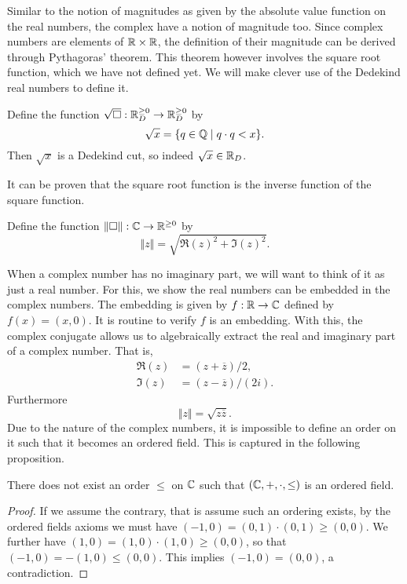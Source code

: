 \documentclass[../main.tex]{subfiles}
\begin{document}
Similar to the notion of magnitudes as given by the absolute value function on the real numbers, the complex have a notion of magnitude too. Since complex numbers are elements of $\mathbb{R}\times\mathbb{R}$, the definition of their magnitude can be derived through Pythagoras' theorem. This theorem however involves the square root function, which we have not defined yet. We will make clever use of the Dedekind real numbers to define it.
\begin{definition}
    Define the function $\sqrt{\Box}:\mathbb{R}_D^{\geq0}\to\mathbb{R}_D^{\geq0}$ by
    \begin{equation*}
        \sqrt{x}=\{q\in\mathbb{Q}\mid q\cdot q<x\}.
    \end{equation*}
    Then $\sqrt{x}$ is a Dedekind cut, so indeed $\sqrt{x}\in\mathbb{R}_D$.
\end{definition}
It can be proven that the square root function is the inverse function of the square function.
\begin{definition}
    Define the function $\Vert\Box\Vert:\mathbb{C}\to\mathbb{R}^{\geq0}$ by
    \begin{equation*}
        \Vert z\Vert=\sqrt{\Re(z)^2+\Im(z)^2}.
    \end{equation*}
\end{definition}
When a complex number has no imaginary part, we will want to think of it as just a real number. For this, we show the real numbers can be embedded in the complex numbers. The embedding is given by $f:\mathbb{R}\to\mathbb{C}$ defined by $f(x)=(x,0)$. It is routine to verify $f$ is an embedding. With this, the complex conjugate allows us to algebraically extract the real and imaginary part of a complex number. That is,
\begin{align*}
    \Re(z) & =(z+\overline{z})/2, \\
    \Im(z) & =(z-\overline{z})/(2i).
\end{align*}
Furthermore
\begin{equation}\label{eqn:the_complex_numbers:norm}
    \Vert z\Vert=\sqrt{z\overline{z}}.
\end{equation}
Due to the nature of the complex numbers, it is impossible to define an order on it such that it becomes an ordered field. This is captured in the following proposition.
\begin{proposition}
    There does not exist an order $\leq$ on $\mathbb{C}$ such that $(\mathbb{C},+,\cdot,\leq)$ is an ordered field.
\end{proposition}
\begin{proof}
    If we assume the contrary, that is assume such an ordering exists, by the ordered fields axioms we must have $(-1,0)=(0,1)\cdot(0,1)\geq(0,0)$. We further have $(1,0)=(1,0)\cdot(1,0)\geq(0,0)$, so that $(-1,0)=-(1,0)\leq(0,0)$. This implies $(-1,0)=(0,0)$, a contradiction.
\end{proof}
\end{document}
